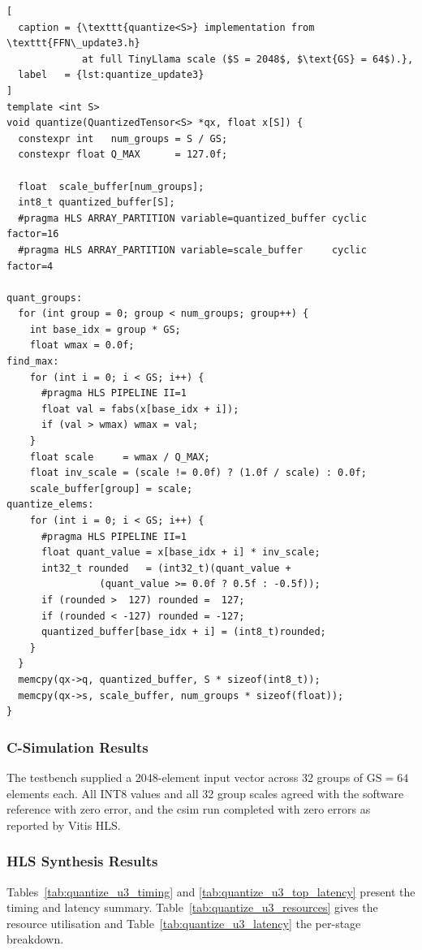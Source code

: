 \begin{lstlisting}[
  caption = {\texttt{quantize<S>} implementation from \texttt{FFN\_update3.h}
             at full TinyLlama scale ($S = 2048$, $\text{GS} = 64$).},
  label   = {lst:quantize_update3}
]
template <int S>
void quantize(QuantizedTensor<S> *qx, float x[S]) {
  constexpr int   num_groups = S / GS;
  constexpr float Q_MAX      = 127.0f;

  float  scale_buffer[num_groups];
  int8_t quantized_buffer[S];
  #pragma HLS ARRAY_PARTITION variable=quantized_buffer cyclic factor=16
  #pragma HLS ARRAY_PARTITION variable=scale_buffer     cyclic factor=4

quant_groups:
  for (int group = 0; group < num_groups; group++) {
    int base_idx = group * GS;
    float wmax = 0.0f;
find_max:
    for (int i = 0; i < GS; i++) {
      #pragma HLS PIPELINE II=1
      float val = fabs(x[base_idx + i]);
      if (val > wmax) wmax = val;
    }
    float scale     = wmax / Q_MAX;
    float inv_scale = (scale != 0.0f) ? (1.0f / scale) : 0.0f;
    scale_buffer[group] = scale;
quantize_elems:
    for (int i = 0; i < GS; i++) {
      #pragma HLS PIPELINE II=1
      float quant_value = x[base_idx + i] * inv_scale;
      int32_t rounded   = (int32_t)(quant_value +
                (quant_value >= 0.0f ? 0.5f : -0.5f));
      if (rounded >  127) rounded =  127;
      if (rounded < -127) rounded = -127;
      quantized_buffer[base_idx + i] = (int8_t)rounded;
    }
  }
  memcpy(qx->q, quantized_buffer, S * sizeof(int8_t));
  memcpy(qx->s, scale_buffer, num_groups * sizeof(float));
}
\end{lstlisting}

\subsubsection{C-Simulation Results}
\label{subsubsec:quantize_update3_csim}

The testbench supplied a 2048-element input vector across 32 groups of
$\text{GS} = 64$ elements each. All INT8 values and all 32 group scales
agreed with the software reference with zero error, and the csim run
completed with zero errors as reported by Vitis HLS.

\subsubsection{HLS Synthesis Results}
\label{subsubsec:quantize_update3_csyn}

Tables~\ref{tab:quantize_u3_timing} and \ref{tab:quantize_u3_top_latency}
present the timing and latency summary. Table~\ref{tab:quantize_u3_resources}
gives the resource utilisation and Table~\ref{tab:quantize_u3_latency} the
per-stage breakdown.


